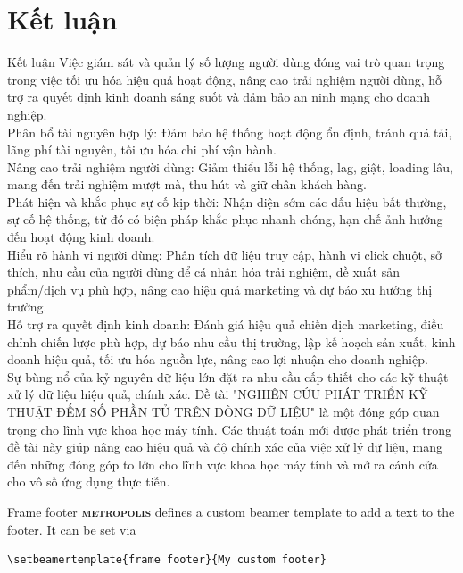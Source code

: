 \documentclass[10pt]{beamer}
\newcommand{\themename}{\textbf{\textsc{metropolis}}\xspace}
\begin{document}
\section{Kết luận}
\begin{frame}{Kết luận}
  Việc giám sát và quản lý số lượng người dùng đóng vai trò quan trọng trong việc tối ưu hóa hiệu quả hoạt động, 
nâng cao trải nghiệm người dùng, hỗ trợ ra quyết định kinh doanh sáng suốt và đảm bảo an ninh mạng cho doanh nghiệp.\\

Phân bổ tài nguyên hợp lý: Đảm bảo hệ thống hoạt động ổn định, tránh quá tải, lãng phí tài nguyên, tối ưu hóa chi phí vận hành.\\

Nâng cao trải nghiệm người dùng: Giảm thiểu lỗi hệ thống, lag, giật, loading lâu, mang đến trải nghiệm mượt mà, thu hút và giữ chân khách hàng.\\

Phát hiện và khắc phục sự cố kịp thời: Nhận diện sớm các dấu hiệu bất thường, sự cố hệ thống, từ đó có biện pháp khắc phục nhanh chóng, hạn chế ảnh hưởng đến hoạt động kinh doanh.\\

Hiểu rõ hành vi người dùng: Phân tích dữ liệu truy cập, hành vi click chuột, sở thích, nhu cầu của người dùng để cá nhân hóa trải nghiệm, đề xuất sản phẩm/dịch vụ phù hợp, 
nâng cao hiệu quả marketing và dự báo xu hướng thị trường.\\

Hỗ trợ ra quyết định kinh doanh: Đánh giá hiệu quả chiến dịch marketing, điều chỉnh chiến lược phù hợp, dự báo nhu cầu thị trường, 
lập kế hoạch sản xuất, kinh doanh hiệu quả, tối ưu hóa nguồn lực, nâng cao lợi nhuận cho doanh nghiệp.\\

Sự bùng nổ của kỷ nguyên dữ liệu lớn đặt ra nhu cầu cấp thiết cho các kỹ thuật xử lý dữ liệu hiệu quả, chính xác. 
Đề tài "NGHIÊN CỨU PHÁT TRIỂN KỸ THUẬT ĐẾM SỐ PHẦN TỬ TRÊN DÒNG DỮ LIỆU" là một đóng góp quan trọng cho lĩnh vực khoa học máy tính. 
Các thuật toán mới được phát triển trong đề tài này giúp nâng cao hiệu quả và độ chính xác của việc xử lý dữ liệu, mang đến những đóng góp 
to lớn cho lĩnh vực khoa học máy tính và mở ra cánh cửa cho vô số ứng dụng thực tiễn.\\
\end{frame}

{%
\begin{frame}[fragile]{Frame footer}
    \themename defines a custom beamer template to add a text to the footer. It can be set via
    \begin{verbatim}\setbeamertemplate{frame footer}{My custom footer}\end{verbatim}
\end{frame}
}
\end{document}

